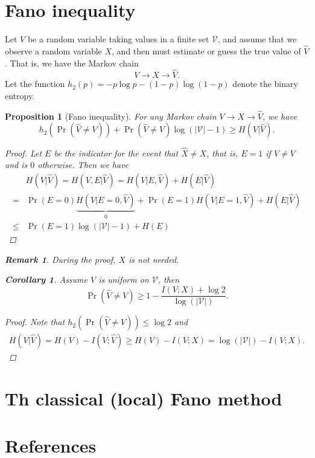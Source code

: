 \documentclass[11pt,letterpaper]{article}
\theoremstyle{plain}
\newtheorem{proposition}{\quad\quad Proposition}
\newtheorem{corollary}{\quad\quad Corollary}
\theoremstyle{definition}
\newtheorem{remark}{\quad\quad Remark}
\theoremstyle{remark}
\begin{document}
\section{Fano inequality}
Let $V$ be a random variable taking values in a finite set $\mathcal{V}$, and assume that we observe a random variable $X$, and then must estimate or guess the true value of $\hat{V}$. That is, we have the Markov chain
$$
V\rightarrow X\rightarrow \hat{V}.
$$
Let the function $h_2(p)=-p\log p-(1-p) \log (1-p)$ denote the binary entropy.
\begin{proposition}[Fano inequality] For any Markov chain $V\rightarrow X\rightarrow \hat{V}$, we have
    $$
    h_2(\Pr(\hat{V}\neq V))+\Pr(\hat{V}\neq V) \log (|\mathcal{V}|-1)\geq H(V|\hat{V}).
    $$
    \begin{proof}
        Let $E$ be the indicator for the event that $\hat{X}\neq X$, that is, $E=1$ if $\hat{V}\neq V$ and is $0$ otherwise.
        Then we have
        \begin{align*}
            &H(V|\hat{V})=H(V,E|\hat{V})=H(V|E,\hat{V})+H(E|\hat{V})\\
            =&\Pr(E=0)\underbrace{H(V|E=0,\hat{V})}_{0}+\Pr(E=1)H(V|E=1,\hat{V})+H(E|\hat{V})\\
            \leq& \Pr(E=1)\log(|\mathcal{V}|-1)+H(E)
        \end{align*}
    \end{proof}
\begin{remark}
During the proof, $X$ is not needed.
\end{remark}
    \begin{corollary}
        Assume $V$ is uniform on $\mathcal{V}$, then
        $$
        \Pr(\hat{V}\neq V)\geq 1-\frac{I(V;X)+\log 2}{\log(|\mathcal{V}|)}.
        $$
    \end{corollary}
    \begin{proof}
Note that $h_2(\Pr(\hat{V}\neq V))\leq \log 2$ and 
        \begin{align*}
            H(V|\hat{V})=H(V)-I(V;\hat{V})
            \geq H(V)-I(V;X)
            =\log(|\mathcal{V}|)-I(V;X).
        \end{align*}
    \end{proof}
    
\end{proposition}

\section{Th classical (local) Fano method}


\section*{References}


\end{document}
